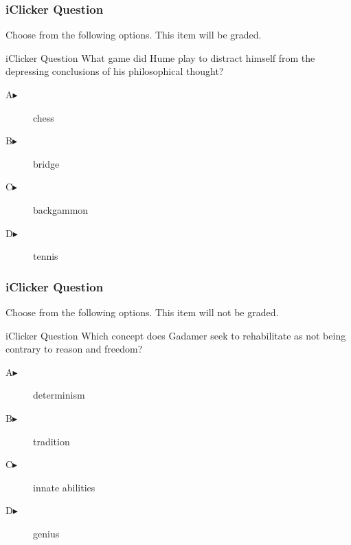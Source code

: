 \documentclass[xcolor=dvipsnames]{beamer}
\begin{document}
\begin{frame}
  \frametitle{iClicker Question}
Choose from the following options. This item will be graded.
\begin{block}{iClicker Question}
What game did Hume play to distract himself from the depressing
conclusions of his philosophical thought?
\end{block}
\begin{description}
\item[A\hspace{.2in}$\blacktriangleright$] chess
\item[B\hspace{.2in}$\blacktriangleright$] bridge
\item[C\hspace{.2in}$\blacktriangleright$] backgammon
\item[D\hspace{.2in}$\blacktriangleright$] tennis
\end{description}
\end{frame}

\begin{frame}
  \frametitle{iClicker Question}
Choose from the following options. This item will not be graded.
\begin{block}{iClicker Question}
Which concept does Gadamer seek to rehabilitate as not being contrary
to reason and freedom?
\end{block}
\begin{description}
\item[A\hspace{.2in}$\blacktriangleright$] determinism
\item[B\hspace{.2in}$\blacktriangleright$] tradition
\item[C\hspace{.2in}$\blacktriangleright$] innate abilities
\item[D\hspace{.2in}$\blacktriangleright$] genius
\end{description}
\end{frame}
\end{document}
